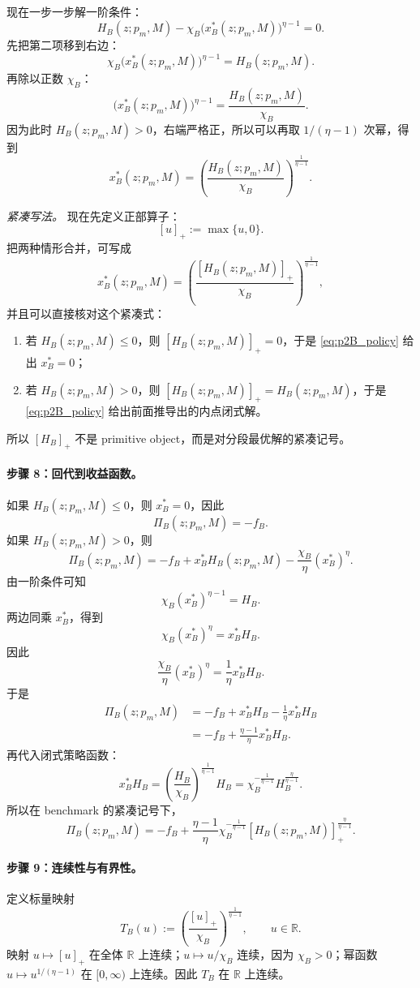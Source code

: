 现在一步一步解一阶条件：
\[
H_B(z;p_m,M)-\chi_B\bigl(x_B^*(z;p_m,M)\bigr)^{\eta-1}=0.
\]
先把第二项移到右边：
\[
\chi_B\bigl(x_B^*(z;p_m,M)\bigr)^{\eta-1}=H_B(z;p_m,M).
\]
再除以正数 $\chi_B$：
\[
\bigl(x_B^*(z;p_m,M)\bigr)^{\eta-1}=\frac{H_B(z;p_m,M)}{\chi_B}.
\]
因为此时 $H_B(z;p_m,M)>0$，右端严格正，所以可以再取 $1/(\eta-1)$ 次幂，得到
\[
x_B^*(z;p_m,M)=\left(\frac{H_B(z;p_m,M)}{\chi_B}\right)^{\frac{1}{\eta-1}}.
\]

\textit{紧凑写法。}
现在先定义正部算子：
\[
[u]_+:=\max\{u,0\}.
\]
把两种情形合并，可写成
\begin{equation}
x_B^*(z;p_m,M)=\left(\frac{[H_B(z;p_m,M)]_+}{\chi_B}\right)^{\frac{1}{\eta-1}},
\label{eq:p2B_policy}
\end{equation}
并且可以直接核对这个紧凑式：
\begin{enumerate}
    \item 若 $H_B(z;p_m,M)\le 0$，则 $[H_B(z;p_m,M)]_+=0$，于是 \eqref{eq:p2B_policy} 给出 $x_B^*=0$；
    \item 若 $H_B(z;p_m,M)>0$，则 $[H_B(z;p_m,M)]_+=H_B(z;p_m,M)$，于是 \eqref{eq:p2B_policy} 给出前面推导出的内点闭式解。
\end{enumerate}
所以 $[H_B]_+$ 不是 primitive object，而是对分段最优解的紧凑记号。

\paragraph{步骤 8：回代到收益函数。}
如果 $H_B(z;p_m,M)\le 0$，则 $x_B^*=0$，因此
\[
\Pi_B(z;p_m,M)=-f_B.
\]
如果 $H_B(z;p_m,M)>0$，则
\[
\Pi_B(z;p_m,M)
=
-f_B+x_B^*H_B(z;p_m,M)-\frac{\chi_B}{\eta}(x_B^*)^\eta.
\]
由一阶条件可知
\[
\chi_B(x_B^*)^{\eta-1}=H_B.
\]
两边同乘 $x_B^*$，得到
\[
\chi_B(x_B^*)^\eta=x_B^*H_B.
\]
因此
\[
\frac{\chi_B}{\eta}(x_B^*)^\eta=\frac{1}{\eta}x_B^*H_B.
\]
于是
\begin{align*}
\Pi_B(z;p_m,M)
&=
-f_B+x_B^*H_B-\frac{1}{\eta}x_B^*H_B\\
&=
-f_B+\frac{\eta-1}{\eta}x_B^*H_B.
\end{align*}
再代入闭式策略函数：
\[
x_B^*H_B
=
\left(\frac{H_B}{\chi_B}\right)^{\frac{1}{\eta-1}}H_B
=
\chi_B^{-\frac{1}{\eta-1}}H_B^{\frac{\eta}{\eta-1}}.
\]
所以在 benchmark 的紧凑记号下，
\begin{equation}
\Pi_B(z;p_m,M)
=
-f_B+\frac{\eta-1}{\eta}\chi_B^{-\frac{1}{\eta-1}}[H_B(z;p_m,M)]_+^{\frac{\eta}{\eta-1}}.
\label{eq:p2B_optimized}
\end{equation}

\paragraph{步骤 9：连续性与有界性。}
定义标量映射
\[
T_B(u):=\left(\frac{[u]_+}{\chi_B}\right)^{\frac{1}{\eta-1}},
\qquad u\in\mathbb R.
\]
映射 $u\mapsto [u]_+$ 在全体 $\mathbb R$ 上连续；$u\mapsto u/\chi_B$ 连续，因为 $\chi_B>0$；幂函数 $u\mapsto u^{1/(\eta-1)}$ 在 $[0,\infty)$ 上连续。因此 $T_B$ 在 $\mathbb R$ 上连续。

